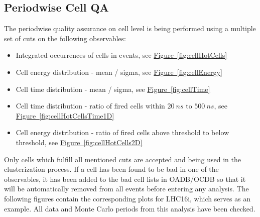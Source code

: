 \subsection{Periodwise Cell QA}
The periodwise quality assurance on cell level is being performed using a multiple set of cuts on the following observables:\vspace{-0.2cm}
\begin{itemize}
\item Integrated occurrences of cells in events, see \hyperref[fig:cellHotCells]{Figure~\ref*{fig:cellHotCells}} \vspace{-0.3cm}
\item Cell energy distribution - mean / sigma, see \hyperref[fig:cellEnergy]{Figure~\ref*{fig:cellEnergy}} \vspace{-0.3cm}
\item Cell time distribution - mean / sigma, see \hyperref[fig:cellTime]{Figure~\ref*{fig:cellTime}} \vspace{-0.3cm}
\item Cell time distribution - ratio of fired cells within $20~ns$ to $500~ns$, see \hyperref[fig:cellHotCellsTime1D]{Figure~\ref*{fig:cellHotCellsTime1D}} \vspace{-0.3cm}
\item Cell energy distribution - ratio of fired cells above threshold to below threshold, see \hyperref[fig:cellHotCells2D]{Figure~\ref*{fig:cellHotCells2D}} \vspace{-0.2cm}
\end{itemize}
Only cells which fulfill all mentioned cuts are accepted and being used in the clusterization process. If a cell has been found to be bad in one of the observables, it has been added to the bad cell lists in OADB/OCDB so that it will be automatically removed from all events before entering any analysis. The following figures contain the corresponding plots for LHC16i, which serves as an example. All data and Monte Carlo periods from this analysis have been checked.

